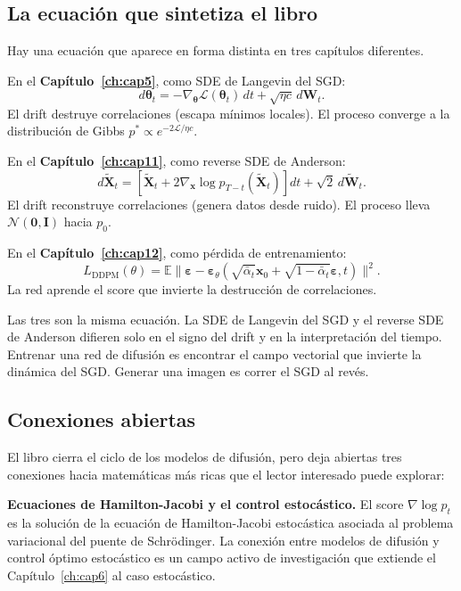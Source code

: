 \subsection{La ecuación que sintetiza el libro}
\label{subsec:ecuacion_central}

Hay una ecuación que aparece en forma distinta en tres capítulos diferentes.

En el \textbf{Capítulo~\ref{ch:cap5}}, como SDE de Langevin del SGD:
\[
  d\bm{\theta}_t = -\nabla_{\bm{\theta}}\mathcal{L}(\bm{\theta}_t)\,dt
  + \sqrt{\eta c}\,d\bm{W}_t.
\]
El drift destruye correlaciones (escapa mínimos locales). El proceso converge
a la distribución de Gibbs $p^* \propto e^{-2\mathcal{L}/\eta c}$.

En el \textbf{Capítulo~\ref{ch:cap11}}, como reverse SDE de Anderson:
\[
  d\tilde{\bm{X}}_t
  = \left[\tilde{\bm{X}}_t + 2\nabla_{\bm{x}}\log p_{T-t}(\tilde{\bm{X}}_t)
  \right]dt + \sqrt{2}\,d\tilde{\bm{W}}_t.
\]
El drift reconstruye correlaciones (genera datos desde ruido). El proceso lleva
$\mathcal{N}(\bm{0},\bm{I})$ hacia $p_0$.

En el \textbf{Capítulo~\ref{ch:cap12}}, como pérdida de entrenamiento:
\[
  L_{\mathrm{DDPM}}(\theta)
  = \mathbb{E}\|\bm{\varepsilon} - \bm{\varepsilon}_\theta(\sqrt{\bar{\alpha}_t}
  \bm{x}_0 + \sqrt{1-\bar{\alpha}_t}\bm{\varepsilon}, t)\|^2.
\]
La red aprende el score que invierte la destrucción de correlaciones.

Las tres son la misma ecuación. La SDE de Langevin del SGD y el reverse SDE de
Anderson difieren solo en el signo del drift y en la interpretación del tiempo.
Entrenar una red de difusión es encontrar el campo vectorial que invierte la
dinámica del SGD. Generar una imagen es correr el SGD al revés.

\subsection{Conexiones abiertas}
\label{subsec:conexiones_abiertas}

El libro cierra el ciclo de los modelos de difusión, pero deja abiertas tres
conexiones hacia matemáticas más ricas que el lector interesado puede explorar:

\textbf{Ecuaciones de Hamilton-Jacobi y el control estocástico.} El score
$\nabla\log p_t$ es la solución de la ecuación de Hamilton-Jacobi estocástica
asociada al problema variacional del puente de Schrödinger. La conexión entre
modelos de difusión y control óptimo estocástico es un campo activo de
investigación que extiende el Capítulo~\ref{ch:cap6} al caso estocástico.

